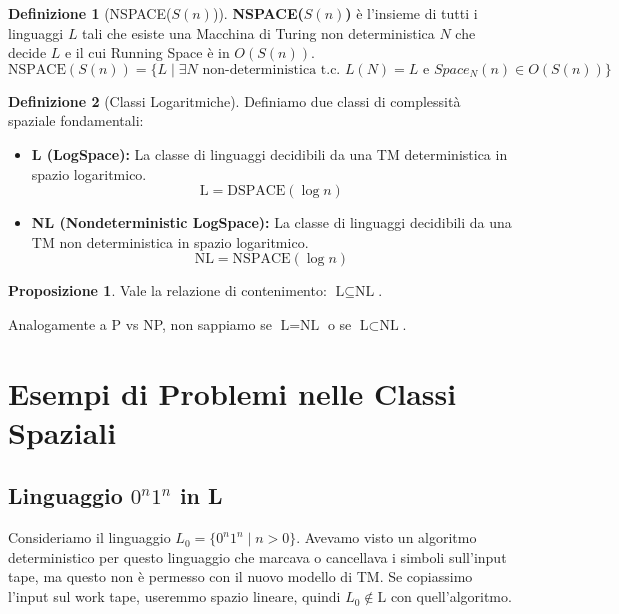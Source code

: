\documentclass[a4paper]{article}
\theoremstyle{definition} %
\newtheorem{definition}{Definizione}[section]
\newtheorem{proposition}{Proposizione}[section]
\begin{document}
\begin{definition}[NSPACE($S(n)$)]
\textbf{NSPACE($S(n)$)} è l'insieme di tutti i linguaggi $L$ tali che esiste una Macchina di Turing non deterministica $N$ che decide $L$ e il cui Running Space è in $O(S(n))$.
\[ \text{NSPACE}(S(n)) = \{ L \mid \exists N \text{ non-deterministica t.c. } L(N) = L \text{ e } Space_N(n) \in O(S(n)) \} \]
\end{definition}

\begin{definition}[Classi Logaritmiche]
Definiamo due classi di complessità spaziale fondamentali:
\begin{itemize}
    \item \textbf{L (LogSpace):} La classe di linguaggi decidibili da una TM deterministica in spazio logaritmico.
    \[ \text{L} = \text{DSPACE}(\log n) \]
    \item \textbf{NL (Nondeterministic LogSpace):} La classe di linguaggi decidibili da una TM non deterministica in spazio logaritmico.
    \[ \text{NL} = \text{NSPACE}(\log n) \]
\end{itemize}
\end{definition}

\begin{proposition}
Vale la relazione di contenimento: $\text{L} \subseteq \text{NL}$.
\end{proposition}
Analogamente a P vs NP, non sappiamo se $\text{L} = \text{NL}$ o se $\text{L} \subset \text{NL}$.

\section{Esempi di Problemi nelle Classi Spaziali}

\subsection{Linguaggio $0^n1^n$ in L}

Consideriamo il linguaggio $L_0 = \{0^n1^n \mid n > 0\}$.
Avevamo visto un algoritmo deterministico per questo linguaggio che marcava o cancellava i simboli sull'input tape, ma questo non è permesso con il nuovo modello di TM. Se copiassimo l'input sul work tape, useremmo spazio lineare, quindi $L_0 \notin \text{L}$ con quell'algoritmo.
\end{document}
